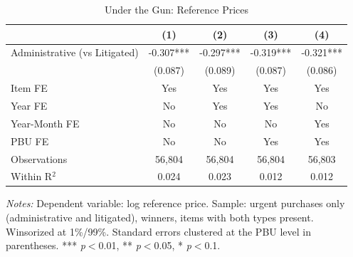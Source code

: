 \begin{table}[ht]
  \centering
  \caption{Under the Gun: Reference Prices}
  \label{tab:t1_utg_ref_prices}
  \small
  \begin{threeparttable}
  \begin{tabular}{lcccc}
    \hline\hline
    & (1) & (2) & (3) & (4) \\
    \hline
    Administrative (vs Litigated) & -0.307*** & -0.297*** & -0.319*** & -0.321*** \\
     & (0.087) & (0.089) & (0.087) & (0.086) \\[3pt]
    \hline
    Item FE & Yes & Yes & Yes & Yes \\
    Year FE & No & Yes & Yes & No \\
    Year-Month FE & No & No & No & Yes \\
    PBU FE & No & No & Yes & Yes \\
    Observations & 56,804 & 56,804 & 56,804 & 56,803 \\
    Within R$^2$ & 0.024 & 0.023 & 0.012 & 0.012 \\
    \hline\hline
  \end{tabular}
  \begin{tablenotes}
    \small
    \item \textit{Notes:} Dependent variable: log reference price. Sample: urgent purchases only (administrative and litigated), winners, items with both types present. Winsorized at 1\%/99\%. Standard errors clustered at the PBU level in parentheses. *** \textit{p}$<$0.01, ** \textit{p}$<$0.05, * \textit{p}$<$0.1.
  \end{tablenotes}
  \end{threeparttable}
\end{table}

